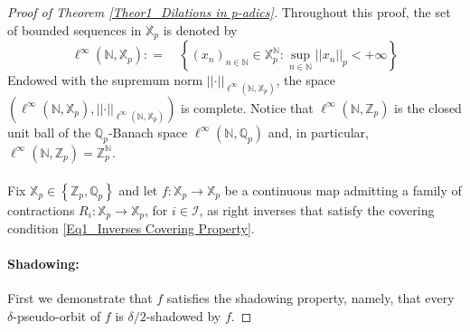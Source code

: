 \documentclass[a4paper, 12pt]{article}
\theoremstyle{definition}
\begin{document}
	
	
	\begin{proof}[Proof of Theorem \ref{Theor1_Dilations in p-adics}]
		
		Throughout this proof, the set of bounded sequences in $\mathbb{X}_{p}$ is denoted by    
		\begin{equation*}
			\ell^{ \infty } \left(   \mathbb{N} ,    \mathbb{X}_{p}  \right)  : = \quad  \left\{   \left(  x_{n}   \right)_{n \in \mathbb{N} } \in \mathbb{X}_{p}^{\mathbb{N} }  : \underset{n \in \mathbb{N} }{\sup}    \left| \left|  x_{n}  \right|  \right|_{p}    <   +\infty  \right\}  
		\end{equation*} 
		Endowed with the supremum norm $ \left| \left|  \cdot  \right|  \right|_{\ell^{ \infty } \left(   \mathbb{N} ,    \mathbb{X}_{p}  \right) }$, the space $ \left(  \ell^{ \infty } \left(   \mathbb{N} ,   \mathbb{X}_{p}  \right) ,  \left| \left|  \cdot  \right|  \right|_{\ell^{ \infty } \left(   \mathbb{N} ,   \mathbb{X}_{p}  \right) }  \right) $ is complete. Notice that $\ell^{ \infty } \left(   \mathbb{N} ,   \mathbb{Z}_{p}  \right) $ is the closed unit ball of the $\mathbb{Q}_{p}$-Banach space $\ell^{ \infty } \left(   \mathbb{N} ,   \mathbb{Q}_{p}  \right) $ and, in particular, $\ell^{ \infty } \left(   \mathbb{N} ,   \mathbb{Z}_{p}  \right)  = \mathbb{Z}_{p}^{\mathbb{N} }$. 
		
		
		\paragraph{} 
		
		Fix $\mathbb{X}_{p} \in  \left\{  \mathbb{Z}_{p}, \mathbb{Q}_{p}  \right\} $ and let $f: \mathbb{X}_{p} \to \mathbb{X}_{p}$ be a continuous map admitting a family of contractions $R_{i}: \mathbb{X}_{p} \to \mathbb{X}_{p}$, for $i \in \mathcal{I}$, as right inverses that satisfy  the covering condition \eqref{Eq1_Inverses Covering Property}. 
		
		
		
		\paragraph{Shadowing:} First we demonstrate that $f$ satisfies the shadowing property, namely, that every $\delta$-pseudo-orbit of $f$ is $\delta/2$-shadowed by $f$. 
		

\end{proof}
\end{document}
